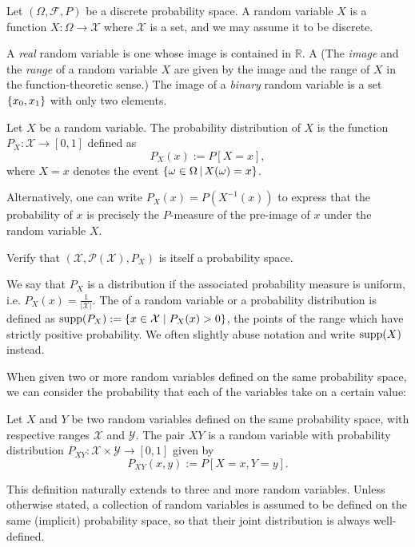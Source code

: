 \begin{definition}
Let $(\Omega, \mathcal{F}, P)$ be a discrete probability space. A
random variable $X$ is a function $X : \Omega \to \mathcal{X}$ where
$\mathcal{X}$ is a set, and we may assume it to be discrete.
\end{definition}
A \emph{real} random variable is one whose image is contained in $\mathbb{R}$. A (The \emph{image} and the \emph{range} of a random variable $X$ are given by the image and the range of $X$ in the function-theoretic sense.) The image of a \emph{binary} random variable is a set $\{x_0, x_1\}$ with only two elements.

\begin{definition}
Let $X$ be a random variable. The probability distribution of $X$ is the function $P_X : \mathcal{X} \to [0,1]$ defined as
\[
P_X(x) := P[X = x],
\]
where $X = x$ denotes the event $\{\omega \in \Omega\,|\,X(\omega) = x\}$.
\end{definition}
Alternatively, one can write $P_X(x) = P(X^{-1}(x))$ to express that the
probability of $x$ is precisely the $P$-measure of the pre-image of $x$
under the random variable $X$.

\begin{exercise}
Verify that $(\mathcal{X},
\mathcal{P}(\mathcal{X}), P_X)$ is itself a probability space.
\end{exercise}

We say that $P_X$ is a  distribution if the associated
probability measure is uniform, i.e. $P_X(x) =
\frac{1}{|\mathcal{X}|}$. The  of a random variable or a
probability distribution is
defined as $\mathrm{supp}(P_X) := \{x \in \mathcal{X} \mid P_X(x) > 0\}$, the
points of the range which have strictly positive probability. We often
slightly abuse notation and write $\mathrm{supp}(X)$ instead.

When given two or more random variables defined on the same probability space, we can consider the probability that each of the variables take on a certain value:

\begin{definition}
Let $X$ and $Y$ be two random variables defined on the same probability space, with respective ranges $\mathcal{X}$ and $\mathcal{Y}$. The pair $XY$ is a random variable with probability distribution $P_{XY} : \mathcal{X} \times \mathcal{Y} \to [0,1]$ given by
\[
P_{XY}(x,y) := P[X = x, Y = y].
\]
\end{definition}
This definition naturally extends to three and more random variables. Unless otherwise stated, a collection of random variables is assumed to be defined on the same (implicit) probability space, so that their joint distribution is always well-defined.

